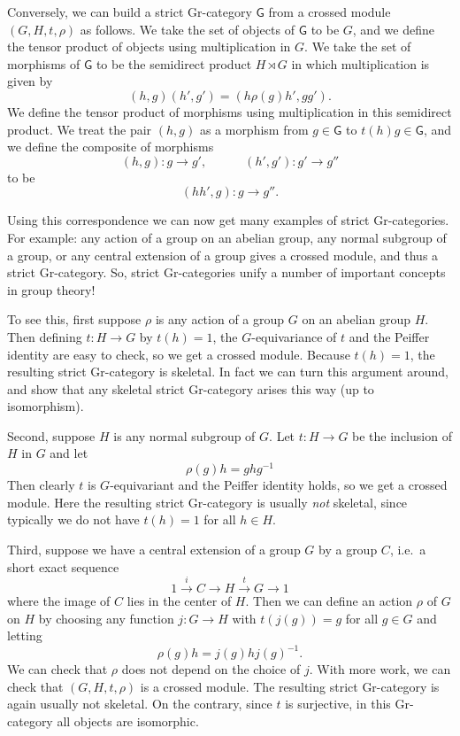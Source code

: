 \documentclass[reqno,12pt]{amsart}
\newcommand{\maps}{\colon}    %
\newcommand{\G}{{\mathsf{G}}}   %
\theoremstyle{definition}
\begin{document}
Conversely, we can build a strict Gr-category $\G$ from a crossed module $(G,H,t,\rho)$ as follows.   We take the set of objects of $\G$ to be $G$, and we define the tensor product of objects using multiplication in $G$.  We take the set of morphisms of $\G$ to be the semidirect product $H \rtimes G$ in which multiplication is given by
\[    (h,g) (h',g') = (h \rho(g)h', gg') .\]
We define the tensor product of morphisms using multiplication in this semidirect product.   We treat the pair $(h,g)$ as a morphism from $g \in \G$ to $t(h) g \in \G$, and we define the composite of morphisms
\[  (h,g) \maps g  \to g'  , \qquad \quad
(h',g') \maps g' \to g'' \] 
to be
\[   (hh',g) \maps g \to g'' .\]

Using this correspondence we can now get many examples of strict Gr-categories.   For example: any action of a group on an abelian group, any normal subgroup of a group, or any central extension of a group gives a crossed module, and thus a strict Gr-category.   So, strict Gr-categories unify a number of important concepts in group theory!

To see this, first suppose $\rho$ is any action of a group $G$ on an abelian group $H$. Then defining $t \maps H \to G$ by $t(h) = 1$, the $G$-equivariance of $t$ and the Peiffer identity are easy to check, so we get a crossed module.  Because $t(h) = 1$, the resulting strict Gr-category is skeletal.  In fact we can turn this argument around, and show that any skeletal strict Gr-category arises this way (up to isomorphism).   

Second, suppose $H$ is any normal subgroup of $G$.  Let
$t \maps H \to G$ be the inclusion of $H$ in $G$ and let 
\[   \rho(g) h = g h g^{-1}  \]
Then clearly $t$ is $G$-equivariant and the Peiffer identity holds, so
we get a crossed module.  Here the resulting strict Gr-category is usually
\emph{not} skeletal, since typically we do not have $t(h) = 1$ for all
$h \in H$.

Third, suppose we have a central extension of a group $G$ by a group
$C$, i.e.\ a short exact sequence
\[       1 \xrightarrow{\; i \; } C \xrightarrow{\phantom{\; i \; }} H \xrightarrow{\; t \; } G \xrightarrow{\phantom{\; t \; }} 1 \]
where the image of $C$ lies in the center of $H$.   Then we can define
an action $\rho$ of $G$ on $H$ by choosing any function $j \maps
G \to H$ with $t (j(g)) = g$ for all $g \in G$ and letting
\[            \rho(g) h = j(g) h j(g)^{-1}   .\]
We can check that $\rho$ does not depend on the choice of $j$.   
With more work, we can check that $(G,H,t,\rho)$ is a crossed module.
The resulting strict Gr-category is again usually not skeletal.  On the contrary, since $t$ is surjective, in this Gr-category all objects are isomorphic.
\end{document}
